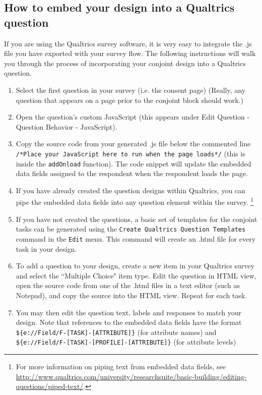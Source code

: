 \documentclass[12pt]{article}
\begin{document}
\subsection{How to embed your design into a Qualtrics question}

If you are using the Qualtrics survey software, it is very easy to integrate the .js file you have exported with your survey flow. The following instructions will walk you through the process of incorporating your conjoint design into a Qualtrics question.
\begin{enumerate}
\item Select the first question in your survey (i.e. the consent page) (Really, any question that appears on a page prior to the conjoint block should work.)
\item Open the question's custom JavaScript (this appears under Edit Question - Question Behavior - JavaScript).
\item Copy the source code from your generated .js file below the commented line \texttt{/*Place your JavaScript here to run when the page loads*/} (this is inside the  \texttt{addOnload} function). The code snippet will update the embedded data fields assigned to the respondent when the respondent loads the page.
\item If you have already created the question designs within Qualtrics, you can pipe the embedded data fields into any question element within the survey. \footnote{For more information on piping text from embedded data fields, see \href{http://www.qualtrics.com/university/researchsuite/basic-building/editing-questions/piped-text/}{http://www.qualtrics.com/university/researchsuite/basic-building/editing-questions/piped-text/}.} 
\item If you have not created the questions, a basic set of templates for the conjoint tasks can be generated using the \texttt{Create Qualtrics Question Templates} command in the \texttt{Edit} menu. This command will create an .html file for every task in your design.
\item To add a question to your design, create a new item in your Qualtrics survey and select the ``Multiple Choice" item type. Edit the question in HTML view, open the source code from one of the .html files in a text editor (such as Notepad), and copy the source into the HTML view. Repeat for each task.
\item You may then edit the question text, labels and responses to match your design. Note that references to the embedded data fields have the format \texttt{\$\{e://Field/F-[TASK]-[ATTRIBUTE]\}} (for attribute names) and \texttt{\$\{e://Field/F-[TASK]-[PROFILE]-[ATTRIBUTE]\}} (for attribute levels)
\end{enumerate}
\end{document}
